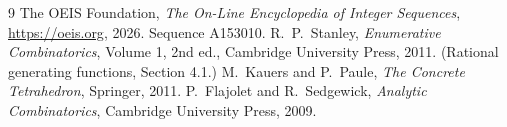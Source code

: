 \documentclass[11pt,a4paper]{article}
\theoremstyle{plain}
\theoremstyle{definition}
\begin{document}
\begin{thebibliography}{9}
 The OEIS Foundation, \emph{The On-Line Encyclopedia of Integer
Sequences}, \url{https://oeis.org}, 2026. Sequence A153010.
 R.~P.~Stanley, \emph{Enumerative Combinatorics}, Volume 1, 2nd ed.,
Cambridge University Press, 2011. (Rational generating functions, Section 4.1.)
 M.~Kauers and P.~Paule, \emph{The Concrete Tetrahedron}, Springer, 2011.
 P.~Flajolet and R.~Sedgewick, \emph{Analytic Combinatorics}, Cambridge
University Press, 2009.
\end{thebibliography}
\end{document}
